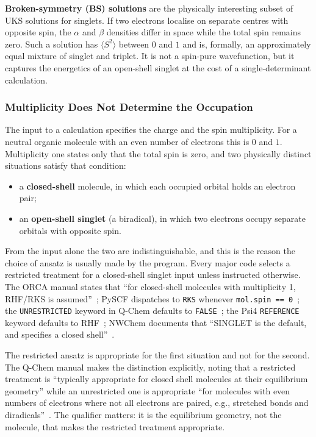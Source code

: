 \textbf{Broken-symmetry (BS) solutions} are the physically interesting subset of
UKS solutions for singlets. If two electrons localise on separate centres with
opposite spin, the $\alpha$ and $\beta$ densities differ in space while the total
spin remains zero. Such a solution has $\langle S^2 \rangle$ between $0$ and $1$
and is, formally, an approximately equal mixture of singlet and triplet. It is
not a spin-pure wavefunction, but it captures the energetics of an open-shell
singlet at the cost of a single-determinant calculation.

\subsubsection{Multiplicity Does Not Determine the Occupation}

The input to a calculation specifies the charge and the spin multiplicity. For a
neutral organic molecule with an even number of electrons this is $0$ and $1$.
Multiplicity one states only that the total spin is zero, and two physically
distinct situations satisfy that condition:

\begin{itemize}
  \item a \textbf{closed-shell} molecule, in which each occupied orbital holds an
    electron pair;
  \item an \textbf{open-shell singlet} (a biradical), in which two electrons
    occupy separate orbitals with opposite spin.
\end{itemize}

From the input alone the two are indistinguishable, and this is the reason the
choice of ansatz is usually made by the program. Every major code selects a
restricted treatment for a closed-shell singlet input unless instructed otherwise.
The ORCA manual states that ``for closed-shell molecules with multiplicity 1,
RHF/RKS is assumed''~\cite{orca_manual}; PySCF dispatches to \texttt{RKS} whenever
\texttt{mol.spin == 0}~\cite{pyscf}; the \texttt{UNRESTRICTED} keyword in Q-Chem
defaults to \texttt{FALSE}~\cite{qchem_manual}; the Psi4 \texttt{REFERENCE}
keyword defaults to RHF~\cite{psi4}; NWChem documents that ``SINGLET is the
default, and specifies a closed shell''~\cite{nwchem}.

The restricted ansatz is appropriate for the first situation and not for the
second. The Q-Chem manual makes the distinction explicitly, noting that a
restricted treatment is ``typically appropriate for closed shell molecules at
their equilibrium geometry'' while an unrestricted one is appropriate ``for
molecules with even numbers of electrons where not all electrons are paired,
e.g., stretched bonds and diradicals''~\cite{qchem_manual}. The qualifier matters:
it is the equilibrium geometry, not the molecule, that makes the restricted
treatment appropriate.

